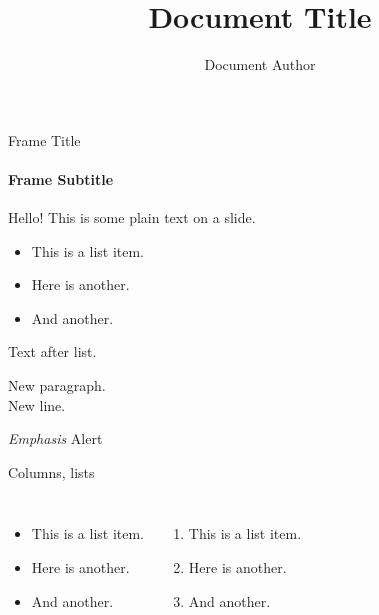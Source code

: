 \documentclass[titlebar,fancyfoot,11pt,qrcode]{khbeamer}
\title{Document Title}
\author{Document Author}
\begin{document}
\begin{frame}
\titlepage
\end{frame}


\begin{frame}{Frame Title}
\framesubtitle{Frame Subtitle}

Hello! This is some plain text on a slide.

\begin{itemize}
\item This is a list item.
\item Here is another.
\item And another.
\end{itemize}

Text after list.

New paragraph.
\\ New line.

\emph{Emphasis} \quad {} \quad \alert{Alert} \quad {}

 \quad {} \quad {} \quad {} \quad {}
\end{frame}


\begin{frame}{Columns, lists}
\begin{columns}
\begin{itemize}
\item This is a list item.
\item Here is another.
\item And another.
\end{itemize}

\begin{enumerate}
\item This is a list item.
\item Here is another.
\item And another.
\end{enumerate}
\end{columns}

\end{frame}
\end{document}
